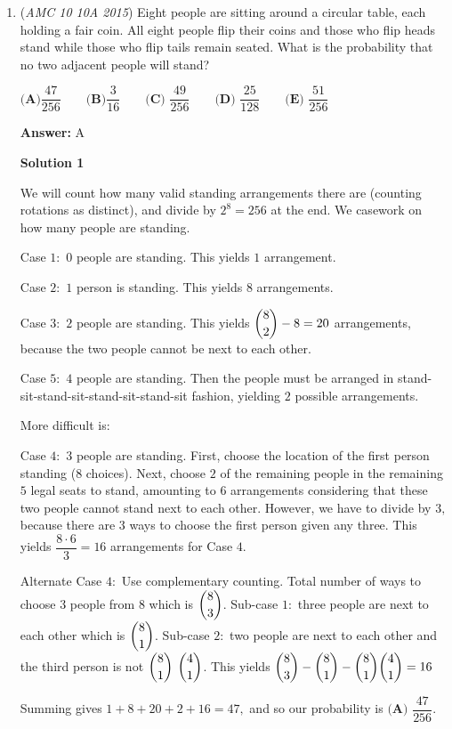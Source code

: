 \begin{enumerate}
	\item (\textit{AMC 10 10A 2015}) Eight people are sitting around a circular table, each holding a fair coin. All eight people flip their coins and those who flip heads stand while those who flip tails remain seated. What is the probability that no two adjacent people will stand?


 $\textbf{(A)}\dfrac{47}{256}\qquad\textbf{(B)}\dfrac{3}{16}\qquad\textbf{(C) }\dfrac{49}{256}\qquad\textbf{(D) }\dfrac{25}{128}\qquad\textbf{(E) }\dfrac{51}{256}$

 \textbf{Answer: }A



\textbf{Solution 1}

We will count how many valid standing arrangements there are (counting rotations as distinct), and divide by $2^8 = 256$ at the end. We casework on how many people are standing.

 Case $1:$ $0$ people are standing. This yields $1$ arrangement.

 Case $2:$ $1$ person is standing. This yields $8$ arrangements.

 Case $3:$ $2$ people are standing. This yields $\dbinom{8}{2} - 8 = 20$ arrangements, because the two people cannot be next to each other.

 Case $5:$ $4$ people are standing. Then the people must be arranged in stand-sit-stand-sit-stand-sit-stand-sit fashion, yielding $2$ possible arrangements.

 More difficult is:

 Case $4:$ $3$ people are standing. First, choose the location of the first person standing ($8$ choices). Next, choose $2$ of the remaining people in the remaining $5$ legal seats to stand, amounting to $6$ arrangements considering that these two people cannot stand next to each other. However, we have to divide by $3,$ because there are $3$ ways to choose the first person given any three. This yields $\dfrac{8 \cdot 6}{3} = 16$ arrangements for Case $4.$

 Alternate Case $4:$ Use complementary counting. Total number of ways to choose 3 people from 8 which is $\dbinom{8}{3}$. Sub-case $1:$ three people are next to each other which is $\dbinom{8}{1}$. Sub-case $2:$ two people are next to each other and the third person is not $\dbinom{8}{1}$ $\dbinom{4}{1}$. This yields $\dbinom{8}{3} - \dbinom{8}{1} - \dbinom{8}{1} \dbinom{4}{1} = 16$ 

 Summing gives $1 + 8 + 20 + 2 + 16 = 47,$ and so our probability is $\boxed{\textbf{(A) } \dfrac{47}{256}}$.


\end{enumerate}
